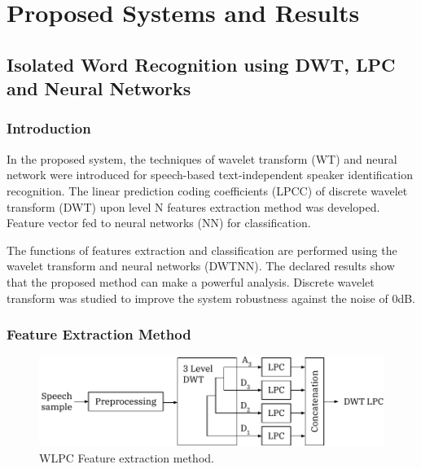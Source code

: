 \documentclass[12pt, a4paper, twoside]{report}
\begin{document}
\chapter{Proposed Systems and Results}
\section{Isolated Word Recognition using DWT, LPC and Neural Networks}
\subsection{Introduction}
In the proposed system, the techniques of wavelet transform (WT) and neural network were introduced for speech-based text-independent speaker identification recognition. The linear prediction coding coefficients (LPCC) of discrete wavelet transform (DWT) upon level N features extraction method was developed. Feature vector fed to neural networks (NN) for classification.
\par
The functions of features extraction and classification are performed using the wavelet transform and neural networks (DWTNN). The declared results show that the proposed method can make a powerful analysis. Discrete wavelet transform was studied to improve the system robustness against the noise of 0dB. 
\subsection{Feature Extraction Method}
\begin{figure}[!h]
	\centering
	\includegraphics[]
	{images/chapter5/dwt-features}
	\caption{WLPC Feature extraction method.}
	\label{fig:dwt-features}
\end{figure}
\end{document}
